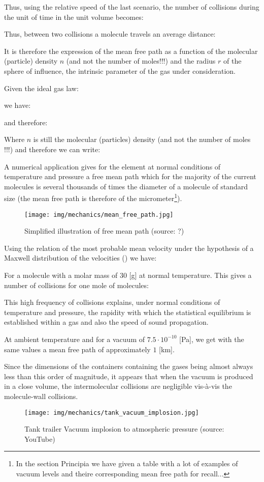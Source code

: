 	Thus, using the relative speed of the last scenario, the number of collisions during the unit of time in the unit volume  becomes:
	
	Thus, between two collisions a molecule travels an average distance:
	
	It is therefore the expression of the mean free path as a function of the molecular (particle) density $n$ (and not the number of moles!!!) and the radius $r$ of the sphere of influence, the intrinsic parameter of the gas under consideration. 

	Given the ideal gas law:
	
	we have:
	
	and therefore:
	
	Where $n$ is still the molecular (particles) density (and not the number of moles !!!) and therefore we can write:
	
	A numerical application gives for the element at normal conditions of temperature and pressure a free mean path which for the majority of the current molecules is several thousands of times the diameter of a molecule of standard size (the mean free path is therefore of the micrometer\footnote{In the section Principia we have given a table with a lot of examples of vacuum levels and theire corresponding mean free path for recall...}).
	\begin{figure}[H]
		\centering
		\texttt{[image: img/mechanics/mean\_free\_path.jpg]}
		\caption{Simplified illustration of free mean path (source: ?)}
	\end{figure}
	Using the relation of the most probable mean velocity  under the hypothesis of a Maxwell distribution of the velocities () we have:
	
	For a molecule with a molar mass of $30$ [g] at normal temperature. This gives a number of collisions for one mole of molecules:
	
	This high frequency of collisions explains, under normal conditions of temperature and pressure, the rapidity with which the statistical equilibrium is established within a gas and also the speed of sound propagation.

	At ambient temperature and for a vacuum of $7.5\cdot 10^{-10}$ [Pa], we get with the same values a mean free path of approximately $1$ [km].

	Since the dimensions of the containers containing the gases being almost always less than this order of magnitude, it appears that when the vacuum is produced in a close volume, the intermolecular collisions are negligible vis-à-vis the molecule-wall collisions.
	\begin{figure}[H]
		\centering
		\texttt{[image: img/mechanics/tank\_vacuum\_implosion.jpg]}
		\caption{Tank trailer Vacuum implosion to atmospheric pressure (source: YouTube)}
	\end{figure}
	
